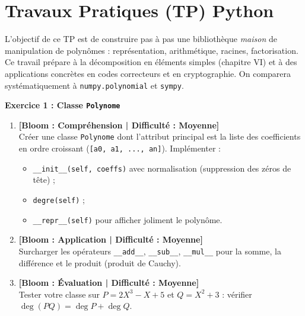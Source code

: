 \documentclass[12pt,a4paper]{report}
\theoremstyle{definition}
\theoremstyle{remark}
\begin{document}
\section*{Travaux Pratiques (TP) Python}

\vspace{0.3cm}
\noindent L'objectif de ce TP est de construire pas à pas une bibliothèque \emph{maison} de manipulation de polynômes : représentation, arithmétique, racines, factorisation. Ce travail prépare à la décomposition en éléments simples (chapitre VI) et à des applications concrètes en codes correcteurs et en cryptographie. On comparera systématiquement à \texttt{numpy.polynomial} et \texttt{sympy}.

\vspace{0.3cm}

\noindent\textbf{Exercice 1 : Classe \texttt{Polynome}}
\begin{enumerate}
    \item \textbf{[Bloom : Compréhension | Difficulté : Moyenne]} \\
    Créer une classe \texttt{Polynome} dont l'attribut principal est la liste des coefficients en ordre croissant (\texttt{[a0, a1, ..., an]}). Implémenter :
    \begin{itemize}
        \item \texttt{\_\_init\_\_(self, coeffs)} avec normalisation (suppression des zéros de tête) ;
        \item \texttt{degre(self)} ;
        \item \texttt{\_\_repr\_\_(self)} pour afficher joliment le polynôme.
    \end{itemize}
    \item \textbf{[Bloom : Application | Difficulté : Moyenne]} \\
    Surcharger les opérateurs \texttt{\_\_add\_\_}, \texttt{\_\_sub\_\_}, \texttt{\_\_mul\_\_} pour la somme, la différence et le produit (produit de Cauchy).
    \item \textbf{[Bloom : Évaluation | Difficulté : Moyenne]} \\
    Tester votre classe sur $P = 2X^3 - X + 5$ et $Q = X^2 + 3$ : vérifier $\deg(PQ) = \deg P + \deg Q$.
\end{enumerate}

\vspace{0.3cm}
\end{document}
